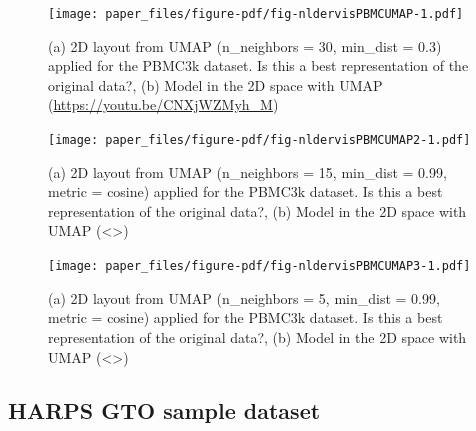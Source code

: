 \documentclass[
  12pt]{article}
\begin{document}
\begin{figure}[h]

{\centering \texttt{[image: paper\_files/figure-pdf/fig-nldervisPBMCUMAP-1.pdf]}

}

\caption{\label{fig-nldervisPBMCUMAP}(a) 2D layout from UMAP
(n\_neighbors = 30, min\_dist = 0.3) applied for the PBMC3k dataset. Is
this a best representation of the original data?, (b) Model in the 2D
space with UMAP (\url{https://youtu.be/CNXjWZMyh_M})}

\end{figure}

\begin{figure}[h]

{\centering \texttt{[image: paper\_files/figure-pdf/fig-nldervisPBMCUMAP2-1.pdf]}

}

\caption{\label{fig-nldervisPBMCUMAP2}(a) 2D layout from UMAP
(n\_neighbors = 15, min\_dist = 0.99, metric = cosine) applied for the
PBMC3k dataset. Is this a best representation of the original data?, (b)
Model in the 2D space with UMAP (\textless\textgreater)}

\end{figure}

\begin{figure}[h]

{\centering \texttt{[image: paper\_files/figure-pdf/fig-nldervisPBMCUMAP3-1.pdf]}

}

\caption{\label{fig-nldervisPBMCUMAP3}(a) 2D layout from UMAP
(n\_neighbors = 5, min\_dist = 0.99, metric = cosine) applied for the
PBMC3k dataset. Is this a best representation of the original data?, (b)
Model in the 2D space with UMAP (\textless\textgreater)}

\end{figure}

\hypertarget{harps-gto-sample-dataset}{%
\subsection{HARPS GTO sample dataset}\label{harps-gto-sample-dataset}}

\citet{Anders2018}
\end{document}
